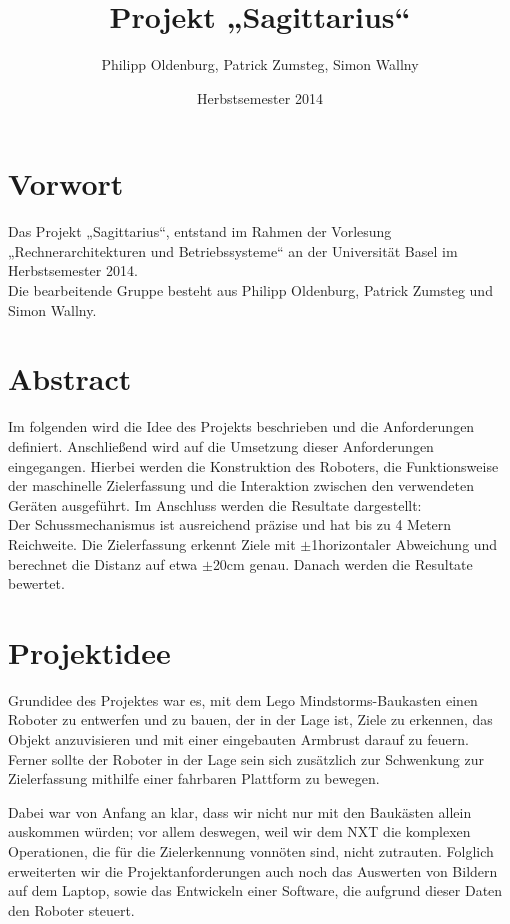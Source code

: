 \documentclass[12pt,a4paper]{article}
\author{Philipp Oldenburg, Patrick Zumsteg, Simon Wallny}
\title{Projekt „Sagittarius“}
\date{Herbstsemester 2014}
\begin{document}
\maketitle
\tableofcontents
\section{Vorwort}
Das Projekt „Sagittarius“, entstand im Rahmen der Vorlesung „Rechnerarchitekturen und Betriebssysteme“ an der Universität Basel im Herbstsemester 2014.\hfill\\
Die bearbeitende Gruppe besteht aus Philipp Oldenburg, Patrick Zumsteg und Simon Wallny.
\newpage
\section{Abstract}
Im folgenden wird die Idee des Projekts beschrieben und die Anforderungen definiert. Anschließend wird auf die Umsetzung dieser Anforderungen eingegangen. Hierbei werden die Konstruktion des Roboters, die Funktionsweise der maschinelle Zielerfassung und die Interaktion zwischen den verwendeten Geräten ausgeführt. Im Anschluss werden die Resultate dargestellt:\hfill\\
Der Schussmechanismus ist ausreichend präzise und hat bis zu 4 Metern Reichweite. Die Zielerfassung erkennt Ziele mit $\pm$1\degree horizontaler Abweichung und berechnet die Distanz auf etwa $\pm$20cm genau.
Danach werden die Resultate bewertet.

\section{Projektidee}

Grundidee des Projektes war es, mit dem Lego Mindstorms-Baukasten einen Roboter zu entwerfen und zu bauen, der in der Lage ist, Ziele zu erkennen, das Objekt anzuvisieren und mit einer eingebauten Armbrust darauf zu feuern.
Ferner sollte der Roboter in der Lage sein sich zusätzlich zur Schwenkung zur Zielerfassung mithilfe einer fahrbaren Plattform zu bewegen.

Dabei war von Anfang an klar, dass wir nicht nur mit den Baukästen allein auskommen würden; vor allem deswegen, weil wir dem NXT die komplexen Operationen, die für die Zielerkennung vonnöten sind, nicht zutrauten. Folglich erweiterten wir die Projektanforderungen auch noch das Auswerten von Bildern auf dem Laptop, sowie das Entwickeln einer Software, die aufgrund dieser Daten den Roboter steuert.
\end{document}
